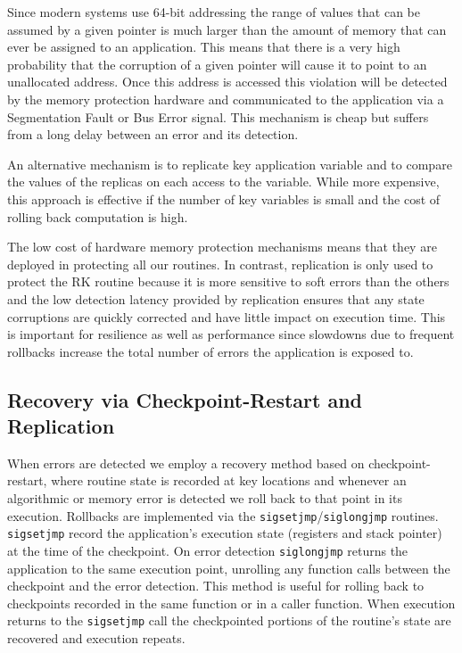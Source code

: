 \documentclass{sig-alternate}
\begin{document}
Since modern systems use 64-bit addressing the range of values that can be assumed by a given pointer is much larger than the amount of memory that can ever be assigned to an application.
This means that there is a very high probability that the corruption of a given pointer will cause it to point to an unallocated address.
Once this address is accessed this violation will be detected by the memory protection hardware and communicated to the application via a Segmentation Fault or Bus Error signal.
This mechanism is cheap but suffers from a long delay between an error and its detection.

An alternative mechanism is to replicate key application variable and to compare the values of the replicas on each access to the variable.
While more expensive, this approach is effective if the number of key variables is small and the cost of rolling back computation is high.

The low cost of hardware memory protection mechanisms means that they are deployed in protecting all our routines.
In contrast, replication is only used to protect the RK routine because it is more sensitive to soft errors than the others and the low detection latency provided by replication ensures that any state corruptions are quickly corrected and have little impact on execution time.
This is important for resilience as well as performance since slowdowns due to frequent rollbacks increase the total number of errors the application is exposed to.

\subsection{Recovery via Checkpoint-Restart and Replication}
\label{sec:res_tech:cr}

When errors are detected we employ a recovery method based on checkpoint-restart, where routine state is recorded at key locations and whenever an algorithmic or memory error is detected we roll back to that point in its execution.
Rollbacks are implemented via the \texttt{sigsetjmp}/\texttt{siglongjmp} routines.
\texttt{sigsetjmp} record the application's execution state (registers and stack pointer) at the time of the checkpoint.
On error detection \texttt{siglongjmp} returns the application to the same execution point, unrolling any function calls between the checkpoint and the error detection.
This method is useful for rolling back to checkpoints recorded in the same function or in a caller function.
When execution returns to the \texttt{sigsetjmp} call the checkpointed portions of the routine's state are recovered and execution repeats.
\end{document}
